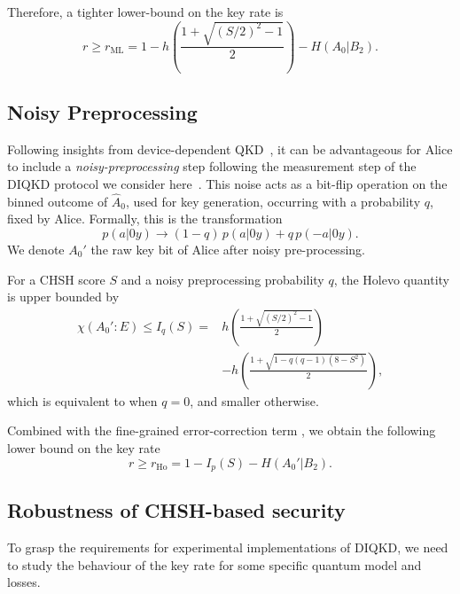 Therefore, a tighter lower-bound on the key rate is
\begin{equation}
	r \geq r_\mathrm{ML} = 1 - h\left(\frac{1+\sqrt{(S/2)^2-1}}{2} \right) - H(A_0|B_2).
	\label{eq:Makr}
\end{equation}


\subsection{Noisy Preprocessing}

Following insights from device-dependent QKD~\cite{Renner2005,Kraus2005,Renes2007}, it can be advantageous for Alice to include a \textit{noisy-preprocessing} step following the measurement step of the DIQKD protocol we consider here~\cite{Ho2020}.
This noise acts as a bit-flip operation on the binned outcome of $\hat{A}_0$, used for key generation, occurring with a probability $q$, fixed by Alice.
Formally, this is the transformation
\begin{equation}
	p(a|0y) \rightarrow (1-q)\,p(a|0y) + q\, p(-a|0y).
\end{equation}
We denote $A_0'$ the raw key bit of Alice after noisy pre-processing.

For a CHSH score $S$ and a noisy preprocessing probability $q$, the Holevo quantity is upper bounded by
\begin{equation}
	\begin{split}
		\chi(A_0' : E) \leq I_q(S) = &h\left(\frac{1+\sqrt{(S/2)^2-1}}{2}\right) \\
									&-h\left(\frac{1+\sqrt{1-q(q-1)(8-S^2)}}{2} \right),
	\end{split}	
\end{equation}
which is equivalent to  when $q=0$, and smaller otherwise.

Combined with the fine-grained error-correction term , we obtain the following lower bound on the key rate
\begin{equation}
	r \geq r_\mathrm{Ho} = 1 - I_p(S) - H(A_0'|B_2).
	\label{eq:Ho}
\end{equation}


\subsection{Robustness of CHSH-based security}
\label{sec:robust_DIQKD}

To grasp the requirements for experimental implementations of DIQKD, we need to study the behaviour of the key rate for some specific quantum model and losses.

